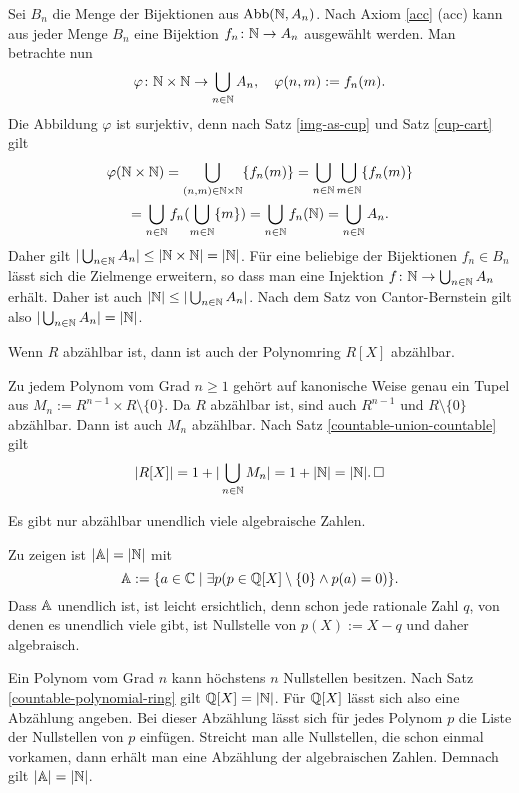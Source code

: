 \begin{Beweis}
Sei $B_n$ die Menge der Bijektionen aus $\operatorname{Abb}(\mathbb N,A_n)$. 
Nach Axiom \ref{acc} (acc) kann aus jeder Menge $B_n$
eine Bijektion $f_n\colon\mathbb N\to A_n$ ausgewählt werden.
Man betrachte nun
\[\varphi\colon\mathbb N\times\mathbb N\to\bigcup_{n\in\mathbb N} A_n,\quad
\varphi(n,m):=f_n(m).\]
Die Abbildung $\varphi$ ist surjektiv, denn nach
Satz \ref{img-as-cup} und Satz \ref{cup-cart} gilt
\begin{gather*}
\varphi(\mathbb N\times\mathbb N) = \bigcup_{(n,m)\in\mathbb N{\times}\mathbb N} \{f_n(m)\}
= \bigcup_{n\in\mathbb N}\bigcup_{m\in\mathbb N} \{f_n(m)\}\\
= \bigcup_{n\in\mathbb N} f_n(\bigcup_{m\in\mathbb N} \{m\})
= \bigcup_{n\in\mathbb N} f_n(\mathbb N) = \bigcup_{n\in\mathbb N} A_n.
\end{gather*}
Daher gilt $|\bigcup_{n\in\mathbb N} A_n|\le |\mathbb N\times \mathbb N| = |\mathbb N|$.
Für eine beliebige der Bijektionen $f_n\in B_n$ lässt sich die Zielmenge
erweitern, so dass man eine Injektion $f\colon\mathbb N\to\bigcup_{n\in\mathbb N} A_n$
erhält. Daher ist auch $|\mathbb N|\le |\bigcup_{n\in\mathbb N} A_n|$. Nach dem
Satz von Cantor-Bernstein gilt also
$|\bigcup_{n\in\mathbb N} A_n|=|\mathbb N|$.\,\qedsymbol
\end{Beweis}

\begin{Satz}\label{countable-polynomial-ring}
Wenn $R$ abzählbar ist, dann ist auch der Polynomring $R[X]$ abzählbar.
\end{Satz}

\begin{Beweis}
Zu jedem Polynom vom Grad $n\ge 1$ gehört auf kanonische Weise
genau ein Tupel aus $M_n:=R^{n-1}\times R\setminus\{0\}$. Da $R$
abzählbar ist, sind auch $R^{n-1}$ und $R\setminus\{0\}$ abzählbar.
Dann ist auch $M_n$ abzählbar. Nach Satz \ref{countable-union-countable}
gilt
\[|R[X]| = 1+|\bigcup_{n\in\mathbb N} M_n| = 1+|\mathbb N| = |\mathbb N|.\,\square\]
\end{Beweis}

\begin{Satz}
Es gibt nur abzählbar unendlich viele algebraische Zahlen.
\end{Satz}

\begin{Beweis}[Beweis 1]
Zu zeigen ist $|\mathbb A|=|\mathbb N|$ mit
\[\mathbb A := \{a\in\mathbb C\mid \exists p(p\in \mathbb Q[X]\setminus\{0\}\land p(a)=0)\}.\]
Dass $\mathbb A$ unendlich ist, ist leicht ersichtlich, denn schon jede
rationale Zahl $q$, von denen es unendlich viele gibt, ist Nullstelle
von $p(X):=X-q$ und daher algebraisch.

Ein Polynom vom Grad $n$ kann höchstens $n$ Nullstellen besitzen.
Nach Satz \ref{countable-polynomial-ring} gilt $\mathbb Q[X]=|\mathbb N|$.
Für $\mathbb Q[X]$ lässt sich also eine Abzählung angeben.
Bei dieser Abzählung lässt sich für jedes Polynom $p$ die Liste der
Nullstellen von $p$ einfügen. Streicht man alle Nullstellen, die schon
einmal vorkamen, dann erhält man eine Abzählung der algebraischen
Zahlen. Demnach gilt $|\mathbb A|=|\mathbb N|$.\,\qedsymbol
\end{Beweis}

